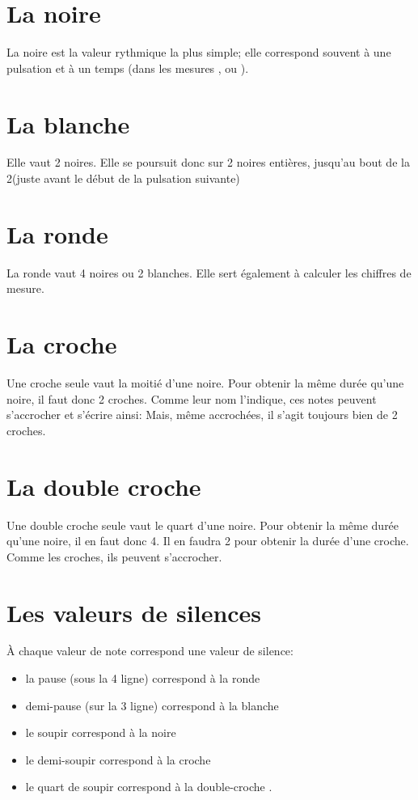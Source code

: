 \section[La noire]{La noire \crotchet}
La noire est la valeur rythmique la plus simple; elle correspond souvent à une pulsation et à un temps (dans les mesures ,  ou ).
\section[La blanche]{La blanche \halfNote}
Elle vaut 2 noires. Elle se poursuit donc sur 2 noires entières, jusqu'au bout de la 2\ieme { }(juste avant le début de la pulsation suivante)
\section[La ronde]{La ronde \wholeNote}
La ronde vaut 4 noires ou 2 blanches. Elle sert également à calculer les chiffres de mesure.
\section[La croche]{La croche \quaver}
Une croche seule vaut la moitié d'une noire. Pour obtenir la même durée qu'une noire, il faut donc 2 croches. Comme leur nom l'indique, ces notes peuvent s'accrocher et s'écrire ainsi: \twoBeamedQuavers{}
Mais, même accrochées, il s'agit toujours bien de 2 croches.
\section[La double croche]{La double croche \semiquaver}
Une double croche seule vaut le quart d'une noire. Pour obtenir la même durée qu'une noire, il en faut donc 4. Il en faudra 2 pour obtenir la durée d'une croche. Comme les croches, ils peuvent s'accrocher. %

\section{Les valeurs de silences}
À chaque valeur de note correspond une valeur de silence:
\begin{itemize}
\item la pause \hspace{1ex}\wholeNoteRest{}\hspace{1ex} (sous la 4\ieme{} ligne) correspond à la ronde
\item demi-pause \hspace{1ex}\halfNoteRest\hspace{1ex} (sur la 3\ieme{} ligne) correspond à la blanche
\item le soupir \crotchetRest{} correspond à la noire
\item le demi-soupir \quaverRest{} correspond à la croche
\item le quart de soupir \semiquaverRest{} correspond à la double-croche .
\end{itemize}

